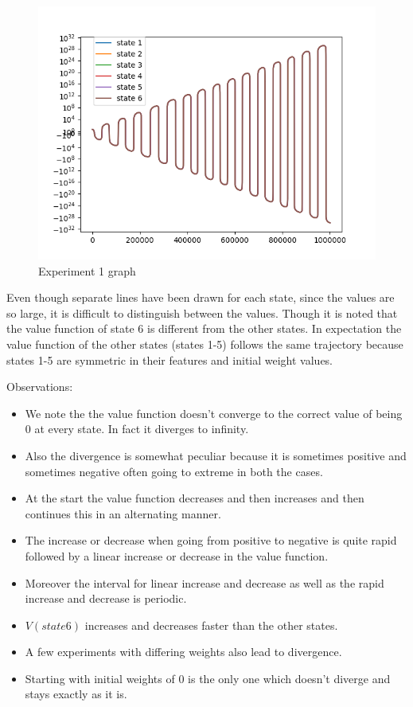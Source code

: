 \documentclass{article}
\begin{document}
\begin{figure}[H]
  \centering
  \includegraphics[scale=0.5]{images/exp1}
  \caption{Experiment 1 graph}
  \label{fig:ex1}
\end{figure}
Even though separate lines have been drawn for each state, since the values are so large, it is difficult to distinguish between the values. Though it is noted that the value function of state 6 is different from the other states. In expectation the value function of the other states (states 1-5) follows the same trajectory because states 1-5 are symmetric in their features and initial weight values.

Observations:
\begin{itemize}
\item We note the the value function doesn't converge to the correct value of being 0 at every state. In fact it diverges to infinity.
\item Also the divergence is somewhat peculiar because it is sometimes positive and sometimes negative often going to extreme in both the cases.
\item At the start the value function decreases and then increases and then continues this in an alternating manner.
\item The increase or decrease when going from positive to negative is quite rapid followed by a linear increase or decrease in the value function.
\item Moreover the interval for linear increase and decrease as well as the rapid increase and decrease is periodic.
\item $V(state6)$ increases and decreases faster than the other states.
\item A few experiments with differing weights also lead to divergence.
\item Starting with initial weights of 0 is the only one which doesn't diverge and stays exactly as it is.
\end{itemize}
\end{document}
